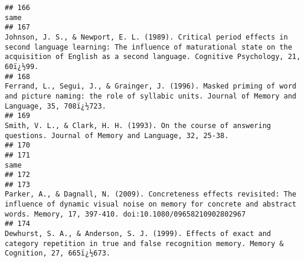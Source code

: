 \documentclass[
  english,
  man]{apa6}
\begin{document}
\begin{verbatim}
## 166                                                                                                                                                                                                                                                                                                                same
## 167                                                                                            Johnson, J. S., & Newport, E. L. (1989). Critical period effects in second language learning: The influence of maturational state on the acquisition of English as a second language. Cognitive Psychology, 21, 60ï¿½99.
## 168                                                                                                                                                Ferrand, L., Segui, J., & Grainger, J. (1996). Masked priming of word and picture naming: the role of syllabic units. Journal of Memory and Language, 35, 708ï¿½723.
## 169                                                                                                                                                                                               Smith, V. L., & Clark, H. H. (1993). On the course of answering questions. Journal of Memory and Language, 32, 25-38.
## 170                                                                                                                                                                                                                                                                                                                    
## 171                                                                                                                                                                                                                                                                                                                same
## 172                                                                                                                                                                                                                                                                                                                    
## 173                                                                                                               Parker, A., & Dagnall, N. (2009). Concreteness effects revisited: The influence of dynamic visual noise on memory for concrete and abstract words. Memory, 17, 397-410. doi:10.1080/09658210902802967
## 174                                                                                                                                                        Dewhurst, S. A., & Anderson, S. J. (1999). Effects of exact and category repetition in true and false recognition memory. Memory & Cognition, 27, 665ï¿½673.

\end{verbatim}
\end{document}
